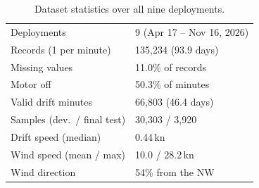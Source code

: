 \documentclass[sigconf]{acmart}
\begin{document}
\begin{table}[t]
\centering\footnotesize
\caption{Dataset statistics over all nine deployments.}
\label{tab:dataset}
\begin{tabular}{@{}ll@{}}
\toprule
Deployments            & 9 (Apr 17 -- Nov 16, 2026) \\
Records (1 per minute) & 135{,}234 (93.9 days) \\
Missing values         & 11.0\% of records \\
Motor off              & 50.3\% of minutes \\
Valid drift minutes    & 66{,}803 (46.4 days) \\
Samples (dev.\ / final test) & 30{,}303 / 3{,}920 \\
Drift speed (median)   & 0.44\,kn \\
Wind speed (mean / max)& 10.0 / 28.2\,kn \\
Wind direction         & 54\% from the NW \\
\bottomrule
\end{tabular}
\end{table}
\end{document}
